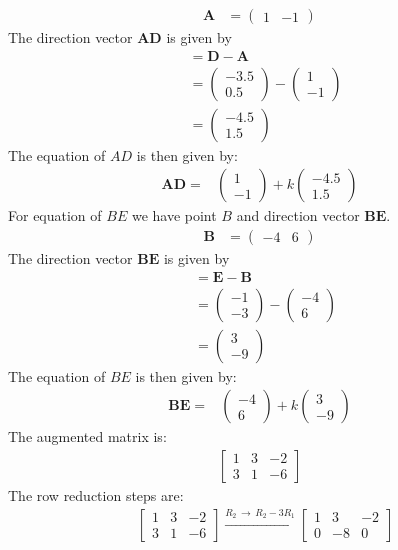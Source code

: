 \documentclass[journal,12pt,twocolumn]{IEEEtran}
\theoremstyle{remark}
\newcommand{\myvec}[1]{\begin{pmatrix}#1\end{pmatrix}}
\let\vec\mathbf
\begin{document}
\begin{align*}
\vec{A} &= \myvec{1 & -1}    
\end{align*}
The direction vector $\vec{AD}$ is given by
\begin{align*}
&= \vec{D} - \vec{A} \\
&= \myvec{-3.5 \\ 0.5} - \myvec{1 \\ -1} \\
&= \myvec{-4.5 \\ 1.5}
\end{align*}
The equation of $AD$ is then given by:
\begin{align}
\vec{AD} = &\myvec{1\\-1} + k \myvec{-4.5\\1.5}\end{align}
For equation of $BE$ we have point $B$ and direction vector $\vec{BE}$.
\begin{align*}
\vec{B} &= \myvec{-4 & 6}    
\end{align*}
The direction vector $\vec{BE}$ is given by
\begin{align*}
&= \vec{E} - \vec{B} \\
&= \myvec{-1 \\ -3} - \myvec{-4 \\ 6} \\
&= \myvec{3 \\ -9}
\end{align*}
The equation of $BE$ is then given by:
\begin{align}
\text{} \vec{BE} = &\myvec{-4\\6} + k \myvec{3\\-9}
\end{align}
The augmented matrix is:
\begin{align*}
\begin{bmatrix}
1 & 3 & -2 \\
3 & 1 & -6
\end{bmatrix}
\end{align*}
The row reduction steps are:\\ 
\begin{align*}
&\begin{bmatrix}
1 & 3 & -2 \\
3 & 1 & -6
\end{bmatrix}
\xrightarrow{R_{2}\,\xrightarrow{}\,R_{2}-3R_{1}}
\begin{bmatrix}
1 & 3 & -2 \\
0 & -8 & 0
\end{bmatrix}
\end{align*}
\end{document}
